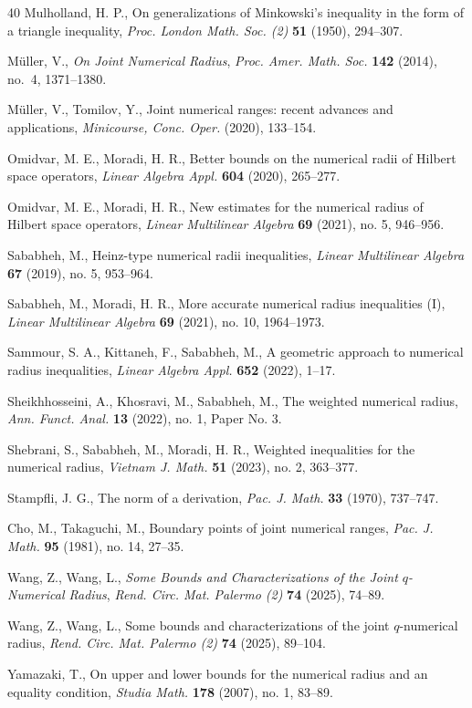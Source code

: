 \documentclass[12pt]{article}
\begin{document}
\begin{thebibliography}{40}
Mulholland, H. P.,
On generalizations of Minkowski’s inequality in the form of a triangle inequality,
\emph{Proc. London Math. Soc. (2)} \textbf{51} (1950), 294--307.

Müller, V.,
\emph{On Joint Numerical Radius},
\emph{Proc. Amer. Math. Soc.} \textbf{142} (2014), no.~4, 1371--1380.

Müller, V., Tomilov, Y.,
Joint numerical ranges: recent advances and applications,
\emph{Minicourse, Conc. Oper.} (2020), 133--154.

Omidvar, M. E., Moradi, H. R.,
Better bounds on the numerical radii of Hilbert space operators,
\emph{Linear Algebra Appl.} \textbf{604} (2020), 265--277.

Omidvar, M. E., Moradi, H. R.,
New estimates for the numerical radius of Hilbert space operators,
\emph{Linear Multilinear Algebra} \textbf{69} (2021), no. 5, 946--956.

Sababheh, M.,
Heinz-type numerical radii inequalities,
\emph{Linear Multilinear Algebra} \textbf{67} (2019), no. 5, 953--964.

Sababheh, M., Moradi, H. R.,
More accurate numerical radius inequalities (I),
\emph{Linear Multilinear Algebra} \textbf{69} (2021), no. 10, 1964--1973.

Sammour, S. A., Kittaneh, F., Sababheh, M.,
A geometric approach to numerical radius inequalities,
\emph{Linear Algebra Appl.} \textbf{652} (2022), 1--17.

Sheikhhosseini, A., Khosravi, M., Sababheh, M.,
The weighted numerical radius,
\emph{Ann. Funct. Anal.} \textbf{13} (2022), no. 1, Paper No. 3.

Shebrani, S., Sababheh, M., Moradi, H. R.,
Weighted inequalities for the numerical radius,
\emph{Vietnam J. Math.} \textbf{51} (2023), no. 2, 363--377.

Stampfli, J. G.,
The norm of a derivation,
\emph{Pac. J. Math.} \textbf{33} (1970), 737--747.

Cho, M., Takaguchi, M.,
Boundary points of joint numerical ranges,
\emph{Pac. J. Math.} \textbf{95} (1981), no. 14, 27--35.

Wang, Z., Wang, L.,
\emph{Some Bounds and Characterizations of the Joint $q$-Numerical Radius},
\emph{Rend. Circ. Mat. Palermo (2)} \textbf{74} (2025), 74--89.

Wang, Z., Wang, L.,
Some bounds and characterizations of the joint $q$-numerical radius,
\emph{Rend. Circ. Mat. Palermo (2)} \textbf{74} (2025), 89--104.

Yamazaki, T.,
On upper and lower bounds for the numerical radius and an equality condition,
\emph{Studia Math.} \textbf{178} (2007), no. 1, 83--89.




\end{thebibliography}
\end{document}
